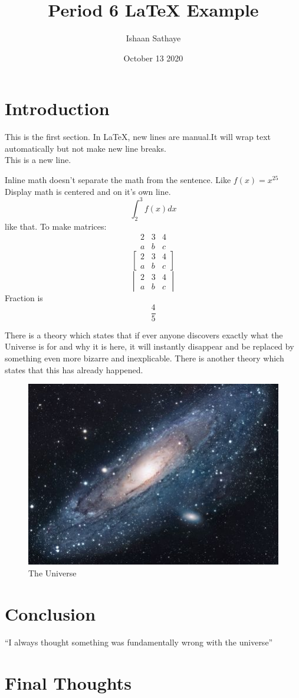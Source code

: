 \documentclass{article}
\title{Period 6 LaTeX Example}
\author{Ishaan Sathaye }
\date{October 13 2020}
\begin{document}

\maketitle %

\section{Introduction}%
This is the first section. In LaTeX, new lines are manual.It will wrap text automatically but not make new line breaks.\\ 
This is a new line.

Inline math doesn't separate the math from the sentence. Like $f(x)=x^25$\\
Display math is centered and on it's own line. $$\int_2^3{f(x)dx}$$ like that.
To make matrices:
$$
\begin{matrix}
2 & 3 & 4 \\
a & b & c
\end{matrix}
$$
$$
\begin{bmatrix}
2 & 3 & 4 \\
a & b & c
\end{bmatrix}
$$
$$
\begin{vmatrix}
2 & 3 & 4 \\
a & b & c
\end{vmatrix}
$$
Fraction is $$\frac{4}{5}$$

There is a theory which states that if ever anyone discovers exactly what the Universe is for and why it is here, it will instantly disappear and be replaced by something even more bizarre and inexplicable.
There is another theory which states that this has already happened.

\begin{figure}[h!]
\centering
\includegraphics[scale=1.7]{universe}
\caption{The Universe}
\label{fig:universe}
\end{figure}

\section{Conclusion}
``I always thought something was fundamentally wrong with the universe'' \citep{adams1995hitchhiker}

\section{Final Thoughts}



\end{document}
